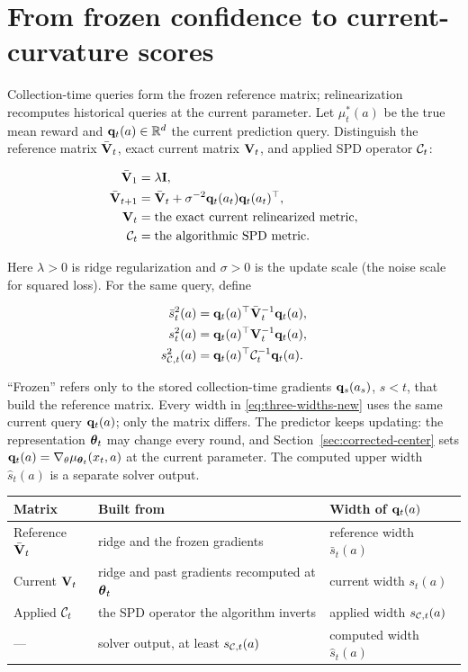 \section{From frozen confidence to current-curvature scores}\label{sec:abstract-transport}

Collection-time queries form the frozen reference matrix; relinearization
recomputes historical queries at the current parameter. Let $\mu_t^*(a)$ be the
true mean reward and $\mathbf{q}_t(a)\in\mathbb{R}^d$ the current prediction query. Distinguish
the reference matrix $\bar{\mathbf{V}}_t$, exact current matrix $\mathbf{V}_t$, and applied SPD
operator $\mathcal{C}_t$:

\begin{align}
 \bar{\mathbf{V}}_1&=\lambda\mathbf{I},\nonumber\\
 \bar{\mathbf{V}}_{t+1}&=\bar{\mathbf{V}}_t+\sigma^{-2}\mathbf{q}_t(a_t)\mathbf{q}_t(a_t)^\top,
 \label{eq:reference-update-new}\\
 \mathbf{V}_t&=\text{the exact current relinearized metric},\nonumber\\
 \mathcal{C}_t&=\text{the algorithmic SPD metric}.\nonumber
\end{align}

Here $\lambda>0$ is ridge regularization and $\sigma>0$ is the update scale
(the noise scale for squared loss). For the same query, define

\begin{equation}\label{eq:three-widths-new}
 \begin{aligned}
  \bar s_t^2(a)&=\mathbf{q}_t(a)^\top\bar{\mathbf{V}}_t^{-1}\mathbf{q}_t(a),\\
  s_t^2(a)&=\mathbf{q}_t(a)^\top\mathbf{V}_t^{-1}\mathbf{q}_t(a),\\
  s_{\mathcal{C},t}^2(a)&=\mathbf{q}_t(a)^\top\mathcal{C}_t^{-1}\mathbf{q}_t(a).
 \end{aligned}
\end{equation}

``Frozen'' refers only to the stored collection-time gradients
$\mathbf{q}_s(a_s)$, $s<t$, that build the reference matrix. Every width in
\eqref{eq:three-widths-new} uses the same current query $\mathbf{q}_t(a)$; only the
matrix differs. The predictor keeps updating: the representation $\boldsymbol{\theta}_t$
may change every round, and Section~\ref{sec:corrected-center} sets
$\mathbf{q}_t(a)=\nabla_\theta\mu_{\boldsymbol{\theta}_t}(x_t,a)$ at the current parameter.
The computed upper width $\hat s_t(a)$ is a separate solver output.

\begin{center}
\begin{tabular}{@{}lll@{}}
\toprule
Matrix & Built from & Width of $\mathbf{q}_t(a)$ \\
\midrule
Reference $\bar{\mathbf{V}}_t$ & ridge and the frozen gradients & reference width $\bar s_t(a)$ \\
Current $\mathbf{V}_t$ & ridge and past gradients recomputed at $\boldsymbol{\theta}_t$ & current width $s_t(a)$ \\
Applied $\mathcal{C}_t$ & the SPD operator the algorithm inverts & applied width $s_{\mathcal{C},t}(a)$ \\
--- & solver output, at least $s_{\mathcal{C},t}(a)$ & computed width $\hat s_t(a)$ \\
\bottomrule
\end{tabular}
\end{center}

